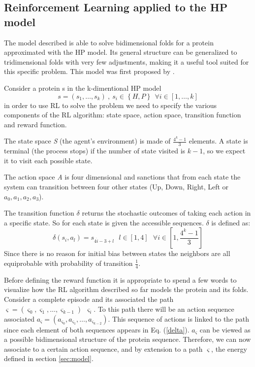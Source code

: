 \subsection{Reinforcement Learning applied to the HP model}
The model described is able to solve bidimensional folds for a protein approximated with the HP model.
Its general structure can be generalized to tridimensional folds with very few adjustments, making it a useful tool suited for this specific problem.
This model was first proposed by \cite{czibula2011reinforcement}.

Consider a protein s in the k-dimentional HP model $$s = \left(s_1, \ldots, s_k\right) \ , \ s_i \in \left\{H, P\right\} \ \ \forall i \in \left[1,\ldots,k\right]$$ in order to use RL to solve the problem we need to specify the various components of the RL algorithm: state space, action space, transition function and reward function.

The state space \emph{S} (the agent's environment) is made of $\frac{4^{k}-1}{3}$ elements.
A state is terminal (the process stops) if the number of state visited is $k-1$, so we expect it to visit each possible state. 

The action space \emph{A} is four dimensional and sanctions that from each state the system can transition between four other states (Up, Down, Right, Left or $a_{0}, a_{1}, a_{2}, a_{3}$).

The transition function $\delta$ returns the stochastic outcomes of taking each action in a specific state.
So for each state is given the accessible sequences.
$\delta$ is defined as:
\begin{equation} \label{delta}
\delta(s_{i},a_{l})=s_{4 \dot i - 3 + l} \ \ \ l \in [1, 4] \ \ \ \forall i \in \left[1,\frac{4^{k}-1}{3}\right]
\end{equation}
Since there is no reason for initial bias between states the neighbors are all equiprobable with probability of transition $\frac{1}{4}$.

Before defining the reward function it is appropriate to spend a few words to visualize how the RL algorithm described so far models the protein and its folds.
Consider a complete episode and its associated the path $\varsigma = (\varsigma_{0}, \varsigma_1, \ldots , \varsigma_{k-1}) \ \ \varsigma_{i}$.
To this path there will be an action sequence associated $a_{\varsigma} = (a_{\varsigma_{0}}, a_{\varsigma_{1}}, \ldots , a_{\varsigma_{k-2}})$.
This sequence of actions is linked to the path since each element of both sequences appears in Eq. (\ref{delta}).
$a_{\varsigma}$ can be viewed as a possible bidimensional structure of the protein sequence.
Therefore, we can now associate to a certain action sequence, and by extension to a path $\varsigma$, the energy defined in section \ref{sec:model}. 

